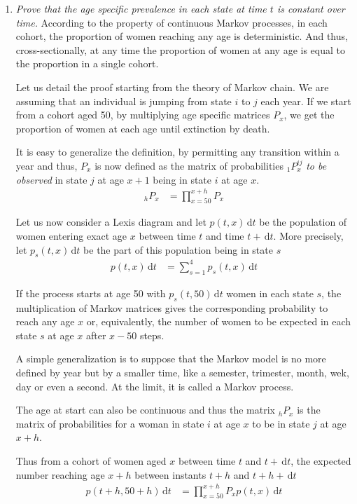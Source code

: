 \documentclass[11pt,letterpaper]{article}
\def\D{{\,\mathrm d}}
\def\D{{\,\mathrm d}}
\begin{document}
\begin{enumerate}
\item \emph{Prove that the age specific prevalence in each state at
    time $t$ is constant over time.}  According to the property of
  continuous Markov processes, in each cohort, the proportion of women
  reaching any age is deterministic. And thus, cross-sectionally, at
  any time the proportion of women at any age is equal to the
  proportion in a single cohort.

  Let us detail the proof starting from the theory of Markov chain. We are assuming that
  an individual is jumping from state $i$ to $j$ each year. If we
  start from a cohort aged 50, by multiplying age specific matrices $P_x$, we
  get the proportion of women at each age until extinction by death.

  It is easy to generalize the definition, by permitting any transition
  within a year and thus, $P_x$ is now defined as the matrix of probabilities $_{1}P^{ij}_x$
  \emph{to be observed} in state $j$ at age $x+1$ being in state $i$
  at age $x$.
  \begin{align*}
    _{h}P_x &= \prod_{x=50}^{x+h} P_x
  \end{align*}

  Let us now consider a Lexis diagram and let $p(t,x)\D t$ be the population of women entering
  exact age $x$ between time $t$ and time $t+ \D t$.
  More precisely, let $p_s(t,x)\D t$ be the part of this population
  being in state $s$
  \begin{align*}
    p(t,x)\D t &= \sum_{s=1}^{4} p_s(t,x) \D t
  \end{align*}

  If the process starts at age 50 with $ p_s(t,50) \D t$ women in each
  state $s$, the multiplication of Markov matrices gives the
  corresponding probability to reach any age $x$ or, equivalently, the number of
  women to be expected in each state $s$ at age $x$ after $x-50$ steps.

  A simple generalization is to suppose that the Markov model is no
  more defined by year but by a smaller time, like a semester, trimester,
  month, wek, day or even a second. At the limit, it is called a Markov process.

  The age at start can also be continuous and thus the matrix $_hP_x$
  is the matrix of probabilities for a woman in state $i$ at age $x$ to be in
  state $j$ at age $x+h$.

 
  Thus from a cohort of women aged $x$ between time $t$ and $t+\D t$,
  the expected number reaching age $x+h$ between instants $t+h$ and
  $t+h+\D t$
  \begin{align*}
       p(t+h,50+h)\D t &= \prod_{x=50}^{x+h} P_x p(t,x) \D t
  \end{align*}
  

\end{enumerate}
\end{document}
